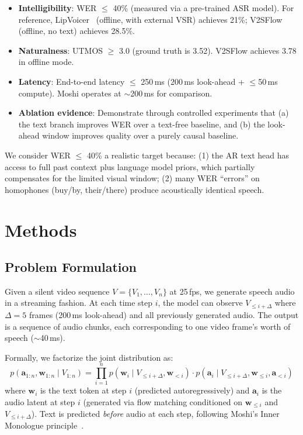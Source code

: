 \documentclass{article}
\begin{document}
\begin{itemize}
    \item \textbf{Intelligibility}: WER $\leq$ 40\% (measured via a pre-trained ASR model). For reference, LipVoicer~\cite{lipvoicer} (offline, with external VSR) achieves 21\%; V2SFlow~\cite{v2sflow} (offline, no text) achieves 28.5\%.
    \item \textbf{Naturalness}: UTMOS $\geq$ 3.0 (ground truth is 3.52). V2SFlow achieves 3.78 in offline mode.
    \item \textbf{Latency}: End-to-end latency $\leq$ 250\,ms (200\,ms look-ahead + $\leq$50\,ms compute). Moshi operates at $\sim$200\,ms for comparison.
    \item \textbf{Ablation evidence}: Demonstrate through controlled experiments that (a) the text branch improves WER over a text-free baseline, and (b) the look-ahead window improves quality over a purely causal baseline.
\end{itemize}

We consider WER $\leq$ 40\% a realistic target because: (1) the AR text head has access to full past context plus language model priors, which partially compensates for the limited visual window; (2) many WER ``errors'' on homophones (buy/by, their/there) produce acoustically identical speech.

\section{Methods}

\subsection{Problem Formulation}

Given a silent video sequence $V = \{V_1, \ldots, V_n\}$ at 25\,fps, we generate speech audio in a streaming fashion. At each time step $i$, the model can observe $V_{\leq i+\Delta}$ where $\Delta{=}5$ frames (200\,ms look-ahead) and all previously generated audio. The output is a sequence of audio chunks, each corresponding to one video frame's worth of speech ($\sim$40\,ms).

Formally, we factorize the joint distribution as:
\begin{equation}
    p(\mathbf{a}_{1:n}, \mathbf{w}_{1:n} \mid V_{1:n}) = \prod_{i=1}^{n} p(\mathbf{w}_i \mid V_{\leq i+\Delta}, \mathbf{w}_{<i}) \cdot p(\mathbf{a}_i \mid V_{\leq i+\Delta}, \mathbf{w}_{\leq i}, \mathbf{a}_{<i})
\end{equation}
where $\mathbf{w}_i$ is the text token at step $i$ (predicted autoregressively) and $\mathbf{a}_i$ is the audio latent at step $i$ (generated via flow matching conditioned on $\mathbf{w}_{\leq i}$ and $V_{\leq i+\Delta}$). Text is predicted \textit{before} audio at each step, following Moshi's Inner Monologue principle~\cite{moshi}.
\end{document}
